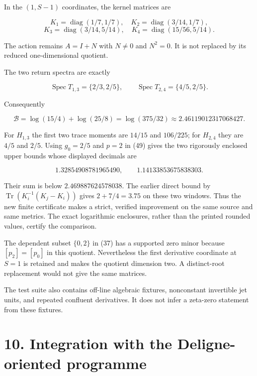 \documentclass[
  11pt,
]{article}
\begin{document}
In the \((1,S-1)\) coordinates, the kernel matrices are

\[
 K_1=\operatorname{diag}(1/7,1/7),\quad
 K_2=\operatorname{diag}(3/14,1/7),
\] \[
 K_3=\operatorname{diag}(3/14,5/14),\quad
 K_4=\operatorname{diag}(15/56,5/14).                              \tag{62}
\]

The action remains \(A=I+N\) with \(N\ne0\) and \(N^2=0\). It is not
replaced by its reduced one-dimensional quotient.

The two return spectra are exactly

\[
 \operatorname{Spec}T_{1,3}=\{2/3,2/5\},\qquad
 \operatorname{Spec}T_{2,4}=\{4/5,2/5\}.                           \tag{63}
\]

Consequently

\[
 \mathcal B=\log(15/4)+\log(25/8)=\log(375/32)
 \approx2.46119012317068427.                                      \tag{64}
\]

For \(H_{1,3}\) the first two trace moments are \(14/15\) and
\(106/225\); for \(H_{2,4}\) they are \(4/5\) and \(2/5\). Using
\(g_0=2/5\) and \(p=2\) in (49) gives the two rigorously enclosed upper
bounds whose displayed decimals are

\[
 1.32854908781965490,\qquad1.14133853675838303.                    \tag{65}
\]

Their sum is below \(2.469887624578038\). The earlier direct bound by
\(\operatorname{Tr}(K_i^{-1}(K_j-K_i))\) gives \(2+7/4=3.75\) on these
two windows. Thus the new finite certificate makes a strict, verified
improvement on the same source and same metrics. The exact logarithmic
enclosures, rather than the printed rounded values, certify the
comparison.

The dependent subset \(\{0,2\}\) in (37) has a supported zero minor
because \([p_2]=[p_0]\) in this quotient. Nevertheless the first
derivative coordinate at \(S=1\) is retained and makes the quotient
dimension two. A distinct-root replacement would not give the same
matrices.

The test suite also contains off-line algebraic fixtures, nonconstant
invertible jet units, and repeated confluent derivatives. It does not
infer a zeta-zero statement from these fixtures.

\section{10. Integration with the Deligne-oriented
programme}\label{integration-with-the-deligne-oriented-programme}
\end{document}
